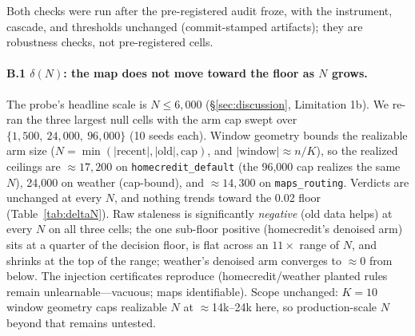 \documentclass[10pt]{article} %
\begin{document}
Both checks were run after the pre-registered audit froze, with the instrument, cascade, and
thresholds unchanged (commit-stamped artifacts); they are robustness checks, not pre-registered
cells.

\paragraph{B.1 $\delta(N)$: the map does not move toward the floor as $N$ grows.} The probe's
headline scale is $N \le 6{,}000$ (\S\ref{sec:discussion}, Limitation 1b). We re-ran the three
largest null cells with the arm cap swept over $\{1{,}500,\ 24{,}000,\ 96{,}000\}$ (10 seeds
each). Window geometry bounds the realizable arm size ($N = \min(|\text{recent}|, |\text{old}|,
\text{cap})$, and $|\text{window}| \approx n/K$), so the realized ceilings are ${\approx}17{,}200$
on \texttt{homecredit\_default} (the 96{,}000 cap realizes the same $N$), 24{,}000 on weather
(cap-bound), and ${\approx}14{,}300$ on \texttt{maps\_routing}. Verdicts are unchanged at every
$N$, and nothing trends toward the 0.02 floor (Table~\ref{tab:deltaN}). Raw staleness is
significantly \emph{negative} (old data helps) at every $N$ on all three cells; the one
sub-floor positive (homecredit's denoised arm) sits at a quarter of the decision floor, is flat
across an $11\times$ range of $N$, and shrinks at the top of the range; weather's denoised arm
converges to ${\approx}0$ from below. The injection certificates reproduce (homecredit/weather
planted rules remain unlearnable---vacuous; maps identifiable). Scope unchanged: $K = 10$ window
geometry caps realizable $N$ at ${\approx}$14k--24k here, so production-scale $N$ beyond that
remains untested.
\end{document}
